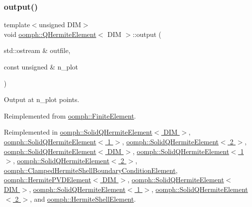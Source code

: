 \mbox{\label{classoomph_1_1QHermiteElement_a8053b3b58ea769a5e7be72982d594c0d}} 
\subsubsection{\texorpdfstring{output()}{output()}\hspace{0.1cm}{\footnotesize\ttfamily [6/12]}}
{\footnotesize\ttfamily template$<$unsigned D\+IM$>$ \\
void \hyperlink{classoomph_1_1QHermiteElement}{oomph\+::\+Q\+Hermite\+Element}$<$ D\+IM $>$\+::output (\begin{DoxyParamCaption}\item[{std\+::ostream \&}]{outfile,  }\item[{const unsigned \&}]{n\+\_\+plot }\end{DoxyParamCaption})\hspace{0.3cm}{\ttfamily [virtual]}}



Output at n\+\_\+plot points. 



Reimplemented from \hyperlink{classoomph_1_1FiniteElement_afa9d9b2670f999b43e6679c9dd28c457}{oomph\+::\+Finite\+Element}.



Reimplemented in \hyperlink{classoomph_1_1SolidQHermiteElement_ade1e06d5bf37699c512cd91c013dd1e9}{oomph\+::\+Solid\+Q\+Hermite\+Element$<$ D\+I\+M $>$}, \hyperlink{classoomph_1_1SolidQHermiteElement_ade1e06d5bf37699c512cd91c013dd1e9}{oomph\+::\+Solid\+Q\+Hermite\+Element$<$ 1 $>$}, \hyperlink{classoomph_1_1SolidQHermiteElement_ade1e06d5bf37699c512cd91c013dd1e9}{oomph\+::\+Solid\+Q\+Hermite\+Element$<$ 2 $>$}, \hyperlink{classoomph_1_1SolidQHermiteElement_adef773329622efbbe113755da62a9cae}{oomph\+::\+Solid\+Q\+Hermite\+Element$<$ D\+I\+M $>$}, \hyperlink{classoomph_1_1SolidQHermiteElement_adef773329622efbbe113755da62a9cae}{oomph\+::\+Solid\+Q\+Hermite\+Element$<$ 1 $>$}, \hyperlink{classoomph_1_1SolidQHermiteElement_adef773329622efbbe113755da62a9cae}{oomph\+::\+Solid\+Q\+Hermite\+Element$<$ 2 $>$}, \hyperlink{classoomph_1_1ClampedHermiteShellBoundaryConditionElement_a099a046661da996bac32617c0479b220}{oomph\+::\+Clamped\+Hermite\+Shell\+Boundary\+Condition\+Element}, \hyperlink{classoomph_1_1HermitePVDElement_a9de8d6a3b4e844189a97eb19e7b034c1}{oomph\+::\+Hermite\+P\+V\+D\+Element$<$ D\+I\+M $>$}, \hyperlink{classoomph_1_1SolidQHermiteElement_ab86bacc26f319f3266e6de9cfc5b82af}{oomph\+::\+Solid\+Q\+Hermite\+Element$<$ D\+I\+M $>$}, \hyperlink{classoomph_1_1SolidQHermiteElement_ab86bacc26f319f3266e6de9cfc5b82af}{oomph\+::\+Solid\+Q\+Hermite\+Element$<$ 1 $>$}, \hyperlink{classoomph_1_1SolidQHermiteElement_ab86bacc26f319f3266e6de9cfc5b82af}{oomph\+::\+Solid\+Q\+Hermite\+Element$<$ 2 $>$}, and \hyperlink{classoomph_1_1HermiteShellElement_a2f76280c3af060304800b5bc0aeb02d8}{oomph\+::\+Hermite\+Shell\+Element}.


